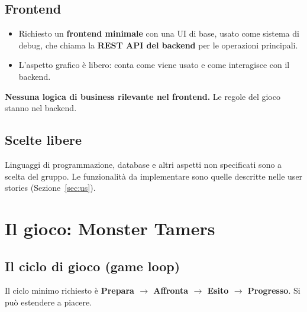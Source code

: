 \documentclass[11pt,a4paper]{article}
\begin{document}
\subsection{Frontend}
\begin{itemize}
  \item Richiesto un \textbf{frontend minimale} con una UI di base, usato come sistema di debug,
        che chiama la \textbf{REST API del backend} per le operazioni principali.
  \item L'aspetto grafico è libero: conta come viene usato e come interagisce con il backend.
\end{itemize}
\begin{warnbox}
\textbf{Nessuna logica di business rilevante nel frontend.} Le regole del gioco stanno nel backend.
\end{warnbox}

\subsection{Scelte libere}
Linguaggi di programmazione, database e altri aspetti non specificati sono a scelta del gruppo.
Le funzionalità da implementare sono quelle descritte nelle user stories (Sezione~\ref{sec:us}).

\needspace{10cm}
\section{Il gioco: Monster Tamers}

\subsection{Il ciclo di gioco (game loop)}

Il ciclo minimo richiesto è \textbf{Prepara $\rightarrow$ Affronta $\rightarrow$ Esito $\rightarrow$ Progresso}.
Si può estendere a piacere.
\end{document}
